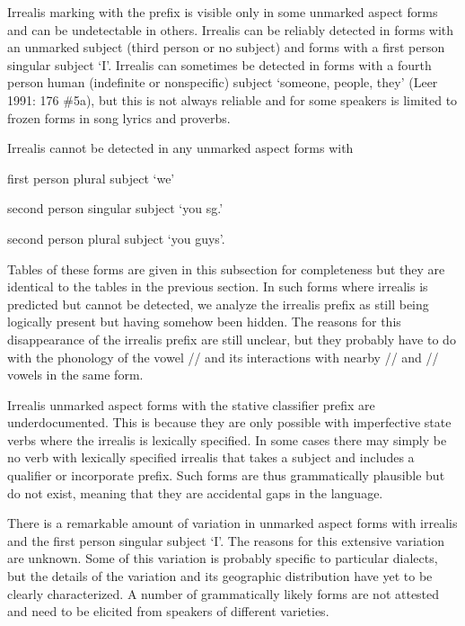 \documentclass[12pt,letterpaper,landscape,oneside,article]{memoir}
\begin{document}
\begin{multicols}{2}
Irrealis marking with the  prefix is visible only in some unmarked aspect forms and can be undetectable in others.
Irrealis can be reliably detected in forms with an unmarked subject (third person or no subject) and forms with a first person singular subject  ‘I’.
Irrealis can sometimes be detected in forms with a fourth person human (indefinite or nonspecific) subject  ‘someone, people, they’ (Leer 1991: 176 \#5a), but this is not always reliable and for some speakers is limited to frozen forms in song lyrics and proverbs.

Irrealis cannot be detected in any unmarked aspect forms with
\begin{inlineenum}
	\item	first person plural subject  ‘we’
	\item	second person singular subject  ‘you sg.’
	\item	second person plural subject  ‘you guys’.
\end{inlineenum}
Tables of these forms are given in this subsection for completeness but they are identical to the tables in the previous section.
In such forms where irrealis  is predicted but cannot be detected, we analyze the irrealis prefix as still being logically present but having somehow been hidden.
The reasons for this disappearance of the irrealis prefix are still unclear, but they probably have to do with the phonology of the vowel // and its interactions with nearby // and // vowels in the same form.

Irrealis unmarked aspect forms with the stative classifier prefix  are underdocumented.
This is because they are only possible with imperfective state verbs where the irrealis  is lexically specified.
In some cases there may simply be no verb with lexically specified irrealis  that takes a subject and includes a qualifier or incorporate prefix.
Such forms are thus grammatically plausible but do not exist, meaning that they are accidental gaps in the language.

There is a remarkable amount of variation in unmarked aspect forms with irrealis  and the first person singular subject  ‘I’.
The reasons for this extensive variation are unknown.
Some of this variation is probably specific to particular dialects, but the details of the variation and its geographic distribution have yet to be clearly characterized.
A number of grammatically likely forms are not attested and need to be elicited from speakers of different varieties.
\end{multicols}
\end{document}
